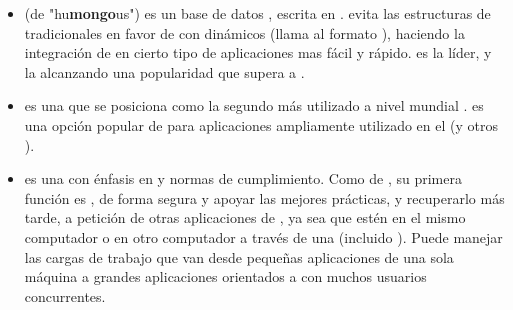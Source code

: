 \begin{itemize}
	\item \textbf{\mongodbNAME} (de "hu\textbf{mongo}us") es un base de datos \documentOriented \openSourcePC, escrita en \cPlusPlus \cite{technology_mongodb}. \mongodbNAME evita las estructuras de \dataBaseDB tradicionales \tableBasedDB en favor de \documentsDB \jsonLikeCPT con \schemasDB dinámicos (\mongodbNAME llama al formato \bsonNAME), haciendo la integración de \dataPC en cierto tipo de aplicaciones mas fácil y rápido. \mongodbNAME es la \nosqlNAME líder, y la alcanzando una popularidad que supera a \postgresql \cite{online_db_engines_ranking}.
	
	\item \textbf{\mysqlNAME} es una \rdbms \openSourcePC que se posiciona como la  segundo más utilizado a nivel mundial \cite{online_db_engines_ranking}\cite{online_dispelling_myths}. \mysqlNAME es una opción popular de \dataBaseDB para aplicaciones \webINT ampliamente utilizado en el \stackAS \lampNAME (y otros \stacksAS  \ampNAME).
	
	\item \textbf{\postgresql} es una \ordbms con énfasis en \extensibilityQA y normas de cumplimiento. Como \serverAS de \dataBaseDB, su primera función es \store \dataPC, de forma segura y apoyar las mejores prácticas, y recuperarlo más tarde, a petición de otras aplicaciones de \softwarePC, ya sea que estén \running en el mismo computador o \running en otro computador a través  de una \network (incluido \internet). Puede manejar las cargas de trabajo que van desde pequeñas aplicaciones de una sola máquina a grandes aplicaciones orientados a \internet con muchos usuarios concurrentes.
	

\end{itemize}
